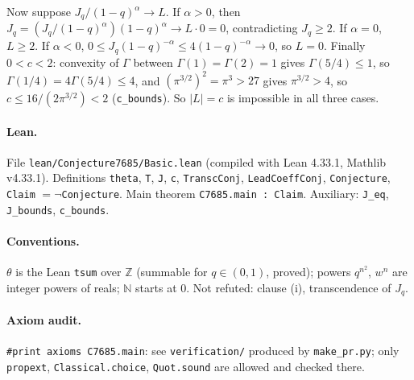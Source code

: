 \documentclass[11pt]{article}
\begin{document}
Now suppose $J_q/(1-q)^\alpha\to L$. If $\alpha>0$, then $J_q=(J_q/(1-q)^\alpha)(1-q)^\alpha\to L\cdot0=0$, contradicting $J_q\ge2$. If $\alpha=0$, $L\ge2$. If $\alpha<0$, $0\le J_q(1-q)^{-\alpha}\le4(1-q)^{-\alpha}\to0$, so $L=0$. Finally $0<c<2$: convexity of $\Gamma$ between $\Gamma(1)=\Gamma(2)=1$ gives $\Gamma(5/4)\le1$, so $\Gamma(1/4)=4\Gamma(5/4)\le4$, and $(\pi^{3/2})^2=\pi^3>27$ gives $\pi^{3/2}>4$, so $c\le16/(2\pi^{3/2})<2$ (\texttt{c\_bounds}). So $|L|=c$ is impossible in all three cases.

\paragraph{Lean.} File \texttt{lean/Conjecture7685/Basic.lean} (compiled with Lean 4.33.1, Mathlib v4.33.1). Definitions \texttt{theta}, \texttt{T}, \texttt{J}, \texttt{c}, \texttt{TranscConj}, \texttt{LeadCoeffConj}, \texttt{Conjecture}, \texttt{Claim} $=\neg$\texttt{Conjecture}. Main theorem \texttt{C7685.main : Claim}. Auxiliary: \texttt{J\_eq}, \texttt{J\_bounds}, \texttt{c\_bounds}.

\paragraph{Conventions.} $\theta$ is the Lean \texttt{tsum} over $\mathbb Z$ (summable for $q\in(0,1)$, proved); powers $q^{n^2}$, $w^n$ are integer powers of reals; $\mathbb N$ starts at $0$. Not refuted: clause (i), transcendence of $J_q$.

\paragraph{Axiom audit.} \texttt{\#print axioms C7685.main}: see \texttt{verification/} produced by \texttt{make\_pr.py}; only \texttt{propext}, \texttt{Classical.choice}, \texttt{Quot.sound} are allowed and checked there.
\end{document}
